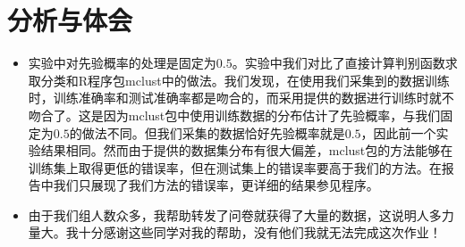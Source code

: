 \section{分析与体会}
\begin{itemize}
	\item 实验中对先验概率的处理是固定为$0.5$。实验中我们对比了直接计算判别函数求取分类和{\ttfamily R}程序包{\ttfamily mclust}中的做法。我们发现，在使用我们采集到的数据训练时，训练准确率和测试准确率都是吻合的，而采用提供的数据进行训练时就不吻合了。这是因为{\ttfamily mclust}包中使用训练数据的分布估计了先验概率，与我们固定为$0.5$的做法不同。但我们采集的数据恰好先验概率就是$0.5$，因此前一个实验结果相同。然而由于提供的数据集分布有很大偏差，{\ttfamily mclust}包的方法能够在训练集上取得更低的错误率，但在测试集上的错误率要高于我们的方法。在报告中我们只展现了我们方法的错误率，更详细的结果参见程序。
	\item 由于我们组人数众多，我帮助转发了问卷就获得了大量的数据，这说明人多力量大。我十分感谢这些同学对我的帮助，没有他们我就无法完成这次作业！
\end{itemize}


